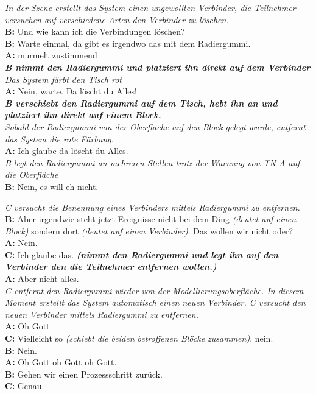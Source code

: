 \begin{transkript}
	\emph{In der Szene erstellt das System einen ungewollten Verbinder, die Teilnehmer versuchen auf verschiedene Arten den Verbinder zu löschen.}\\
	\textbf{B:} Und wie kann ich die Verbindungen löschen?\\
	\textbf{B:} Warte einmal, da gibt es irgendwo das mit dem Radiergummi.\\
	\textbf{A:} murmelt zustimmend \\
	\emph{\textbf{B nimmt den Radiergummi und platziert ihn direkt auf dem Verbinder}}\\
	\emph{Das System färbt den Tisch rot}\\
	\textbf{A:} Nein, warte. Da löscht du Alles!\\
	\emph{\textbf{B verschiebt den Radiergummi auf dem Tisch, hebt ihn an und platziert ihn direkt auf einem Block.}}\\
	\emph{Sobald der Radiergummi von der Oberfläche auf den Block gelegt wurde, entfernt das System die rote Färbung.}\\
	\textbf{A:} Ich glaube da löscht du Alles.\\
	\emph{B legt den Radiergummi an mehreren Stellen trotz der Warnung von TN A auf die Oberfläche}\\
	\textbf{B:} Nein, es will eh nicht.\\
\end{transkript}

\begin{transkript}
	\emph{C versucht die Benennung eines Verbinders mittels Radiergummi zu entfernen.}\\
	\textbf{B:} Aber irgendwie steht jetzt Ereignisse nicht bei dem Ding \emph{(deutet auf einen Block)} sondern dort \emph{(deutet auf einen Verbinder)}. Das wollen wir nicht oder?\\
	\textbf{A:} Nein.\\
	\textbf{C:} Ich glaube das. \emph{\textbf{(nimmt den Radiergummi und legt ihn auf den Verbinder den die Teilnehmer entfernen wollen.)}}\\
	\textbf{A:} Aber nicht alles.\\
	\emph{C entfernt den Radiergummi wieder von der Modellierungsoberfläche. In diesem Moment erstellt das System automatisch einen neuen Verbinder. C versucht den neuen Verbinder mittels Radiergummi zu entfernen.}\\
	\textbf{A:} Oh Gott.\\
	\textbf{C:} Vielleicht so \emph{(schiebt die beiden betroffenen Blöcke zusammen)}, nein.\\
	\textbf{B:} Nein.\\
	\textbf{A:} Oh Gott oh Gott oh Gott.\\
	\textbf{B:} Gehen wir einen Prozessschritt zurück.\\
	\textbf{C:} Genau.\\
\end{transkript}

